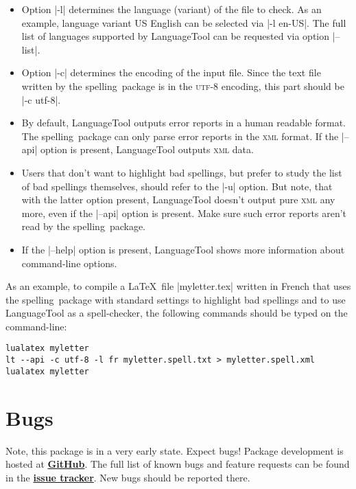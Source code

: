 \documentclass[11pt]{article}
\newcommand*{\pkg}{\textsf{spelling}}
\newcommand*{\acr}[1]{\mbox{\scshape#1}}
\begin{document}
\begin{itemize}

\item Option |-l| determines the language (variant) of the file to
  check.  As an example, language variant US English can be selected via
  |-l en-US|.  The full list of languages supported by LanguageTool can
  be requested via option |--list|.

\item Option |-c| determines the encoding of the input file.  Since the
  text file written by the \pkg\ package is in the \acr{utf-8} encoding,
  this part should be |-c utf-8|.

\item By default, LanguageTool outputs error reports in a human readable
  format.  The \pkg\ package can only parse error reports in the
  \acr{xml} format.  If the |--api| option is present, LanguageTool
  outputs \acr{xml} data.

\item Users that don't want to highlight bad spellings, but prefer to
  study the list of bad spellings themselves, should refer to the |-u|
  option.  But note, that with the latter option present, LanguageTool
  doesn't output pure \acr{xml} any more, even if the |--api| option is
  present.  Make sure such error reports aren't read by the \pkg\
  package.

\item If the |--help| option is present, LanguageTool shows more
  information about command-line options.

\end{itemize}

As an example, to compile a \LaTeX\ file |myletter.tex| written in
French that uses the \pkg\ package with standard settings to highlight
bad spellings and to use LanguageTool as a spell-checker, the following
commands should be typed on the command-line:

\begin{lstlisting}
lualatex myletter
lt --api -c utf-8 -l fr myletter.spell.txt > myletter.spell.xml
lualatex myletter
\end{lstlisting}


\section{Bugs}
\label{sec:bugs}

Note, this package is in a very early state.  Expect bugs!  Package
development is hosted at
\href{http://github.com/sh2d/spelling/}{\bfseries GitHub}.  The full
list of known bugs and feature requests can be found in the
\href{http://github.com/sh2d/spelling/issues/}{\bfseries issue tracker}.
New bugs should be reported there.
\end{document}
